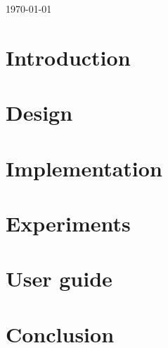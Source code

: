\documentclass[11pt,a4paper,oneside,titlepage]{article}
\begin{document}
\begin{titlepage}
		
		{\large \today}\\[2cm] %
		
		
		
		
		\vfill %
		
	\end{titlepage}

	\section{Introduction} \label{sec:intro}
		
		
	\section{Design} \label{sec:design}
		
		
	\section{Implementation} \label{sec:implementation}
		
			
	\section{Experiments} \label{sec:experiments}
		
	
	\section{User guide} \label{sec:guide}
		
	
	\section{Conclusion} \label{sec:conclusions}
		
	
\end{document}
